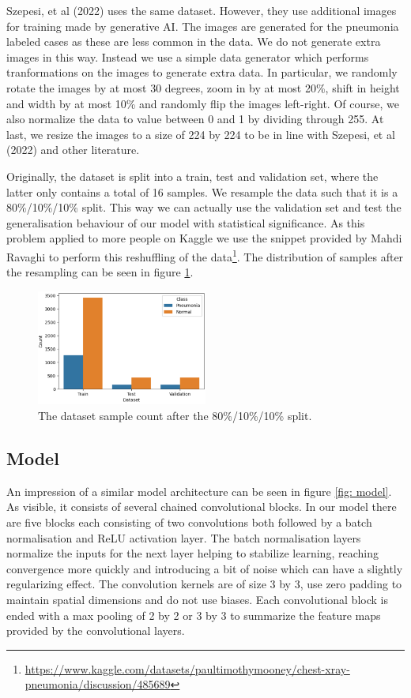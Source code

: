 \documentclass[a4paper]{article}
\begin{document}
Szepesi, et al (2022) uses the same dataset. However, they use additional
images for training made by generative AI. The images are generated for the
pneumonia labeled cases as these are less common in the data. We do not
generate extra images in this way. Instead we use a simple data generator which
performs tranformations on the images to generate extra data. In particular, we
randomly rotate the images by at most 30 degrees, zoom in by at most 20\%,
shift in height and width by at most 10\% and randomly flip the images
left-right. Of course, we also normalize the data to value between 0 and 1 by
dividing through 255. At last, we resize the images to a size of 224 by 224 to
be in line with Szepesi, et al (2022) and other literature.

Originally, the dataset is split into a train, test and validation set, where
the latter only contains a total of 16 samples. We resample the data such that
it is a 80\%/10\%/10\% split. This way we can actually use the validation set
and test the generalisation behaviour of our model with statistical
significance. As this problem applied to more people on Kaggle we use the
snippet provided by Mahdi Ravaghi to perform this reshuffling of the
data\footnote{\url{https://www.kaggle.com/datasets/paultimothymooney/chest-xray-pneumonia/discussion/485689}}.
The distribution of samples after the resampling can be seen in figure
\ref{fig: dataset}.

\begin{figure}[h]
	\centering
	\includegraphics[width = 0.5\textwidth]{imgs/dataset.png}
	\caption{The dataset sample count after the 80\%/10\%/10\% split.}
	\label{fig: dataset}
\end{figure}

\subsection{Model}

An impression of a similar model architecture can be seen in figure \ref{fig:
model}. As visible, it consists of several chained convolutional blocks. In our
model there are five blocks each consisting of two convolutions both followed
by a batch normalisation and ReLU activation layer. The batch normalisation
layers normalize the inputs for the next layer helping to stabilize learning,
reaching convergence more quickly and introducing a bit of noise which can have
a slightly regularizing effect. The convolution kernels are of size 3 by 3, use
zero padding to maintain spatial dimensions and do not use biases. Each
convolutional block is ended with a max pooling of 2 by 2 or 3 by 3 to
summarize the feature maps provided by the convolutional layers.
\end{document}
